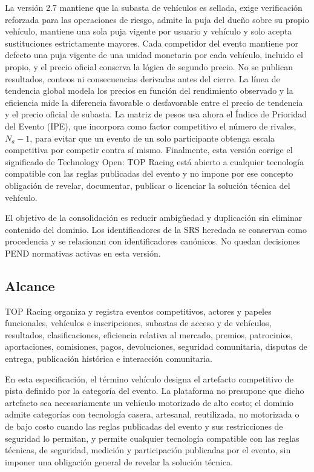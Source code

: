 \documentclass[10pt,letterpaper]{article}
\begin{document}
La versión 2.7 mantiene que la subasta de vehículos es sellada, exige verificación reforzada para las operaciones de riesgo, admite la puja del dueño sobre su propio vehículo, mantiene una sola puja vigente por usuario y vehículo y solo acepta sustituciones estrictamente mayores. Cada competidor del evento mantiene por defecto una puja vigente de una unidad monetaria por cada vehículo, incluido el propio, y el precio oficial conserva la lógica de segundo precio. No se publican resultados, conteos ni consecuencias derivadas antes del cierre. La línea de tendencia global modela los precios en función del rendimiento observado y la eficiencia mide la diferencia favorable o desfavorable entre el precio de tendencia y el precio oficial de subasta. La matriz de pesos usa ahora el Índice de Prioridad del Evento (IPE), que incorpora como factor competitivo el número de rivales, $N_a-1$, para evitar que un evento de un solo participante obtenga escala competitiva por competir contra sí mismo. Finalmente, esta versión corrige el significado de Technology Open: TOP Racing está abierto a cualquier tecnología compatible con las reglas publicadas del evento y no impone por ese concepto obligación de revelar, documentar, publicar o licenciar la solución técnica del vehículo.

El objetivo de la consolidación es reducir ambigüedad y duplicación sin eliminar contenido del dominio. Los identificadores de la SRS heredada se conservan como procedencia y se relacionan con identificadores canónicos. No quedan decisiones PEND normativas activas en esta versión.

\subsection{Alcance}
TOP Racing organiza y registra eventos competitivos, actores y papeles funcionales, vehículos e inscripciones, subastas de acceso y de vehículos, resultados, clasificaciones, eficiencia relativa al mercado, premios, patrocinios, aportaciones, comisiones, pagos, devoluciones, seguridad comunitaria, disputas de entrega, publicación histórica e interacción comunitaria.

En esta especificación, el término vehículo designa el artefacto competitivo de pista definido por la categoría del evento. La plataforma no presupone que dicho artefacto sea necesariamente un vehículo motorizado de alto costo; el dominio admite categorías con tecnología casera, artesanal, reutilizada, no motorizada o de bajo costo cuando las reglas publicadas del evento y sus restricciones de seguridad lo permitan, y permite cualquier tecnología compatible con las reglas técnicas, de seguridad, medición y participación publicadas por el evento, sin imponer una obligación general de revelar la solución técnica.
\end{document}
